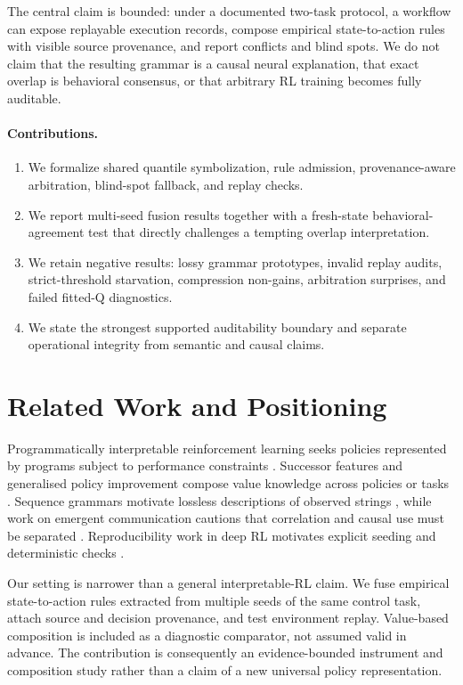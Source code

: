 \documentclass[11pt,a4paper]{article}
\begin{document}
The central claim is bounded: under a documented two-task protocol, a workflow can expose replayable execution records, compose empirical state-to-action rules with visible source provenance, and report conflicts and blind spots. We do not claim that the resulting grammar is a causal neural explanation, that exact overlap is behavioral consensus, or that arbitrary RL training becomes fully auditable.

\paragraph{Contributions.}
\begin{enumerate}[leftmargin=*,itemsep=2pt]
  \item We formalize shared quantile symbolization, rule admission, provenance-aware arbitration, blind-spot fallback, and replay checks.
  \item We report multi-seed fusion results together with a fresh-state behavioral-agreement test that directly challenges a tempting overlap interpretation.
  \item We retain negative results: lossy grammar prototypes, invalid replay audits, strict-threshold starvation, compression non-gains, arbitration surprises, and failed fitted-Q diagnostics.
  \item We state the strongest supported auditability boundary and separate operational integrity from semantic and causal claims.
\end{enumerate}

\section{Related Work and Positioning}
Programmatically interpretable reinforcement learning seeks policies represented by programs subject to performance constraints \cite{verma2018pirl}. Successor features and generalised policy improvement compose value knowledge across policies or tasks \cite{barreto2017sf,thakoor2022gpi}. Sequence grammars motivate lossless descriptions of observed strings \cite{nevill1997sequitur}, while work on emergent communication cautions that correlation and causal use must be separated \cite{lowe2019pitfalls}. Reproducibility work in deep RL motivates explicit seeding and deterministic checks \cite{nagarajan2018det}.

Our setting is narrower than a general interpretable-RL claim. We fuse empirical state-to-action rules extracted from multiple seeds of the same control task, attach source and decision provenance, and test environment replay. Value-based composition is included as a diagnostic comparator, not assumed valid in advance. The contribution is consequently an evidence-bounded instrument and composition study rather than a claim of a new universal policy representation.
\end{document}
